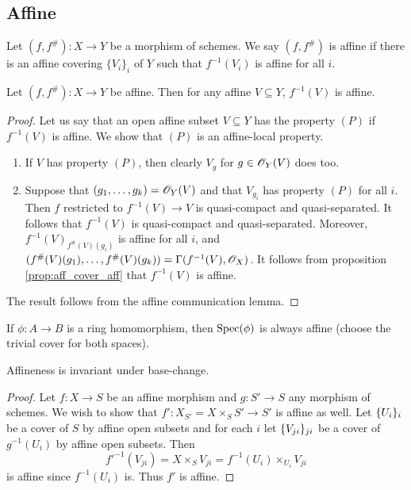\documentclass{memoir}
\begin{document}
\subsection{Affine}
\begin{definition}
    Let $(f,f^\#):X\to Y$ be a morphism of schemes.
    We say $(f,f^\#)$ is affine if there is an affine covering $\{V_i\}_i$ of $Y$ such that $f^{-1}(V_i)$ is affine for all $i$.
\end{definition}
\begin{thm}
    Let $(f,f^\#):X\to Y$ be affine.
    Then for any affine $V\subseteq Y$, $f^{-1}(V)$ is affine.
\end{thm}
\begin{proof}
    Let us say that an open affine subset $V\subseteq Y$ has the property $(P)$ if $f^{-1}(V)$ is affine.
    We show that $(P)$ is an affine-local property.
    \begin{enumerate}
        \item If $V$ has property $(P)$, then clearly $V_g$ for $g\in\mathscr{O}_Y(V)$ does too.
        \item Suppose that $(g_1,\dots,g_k) = \mathscr{O}_Y(V)$ and that $V_{g_i}$ has property $(P)$ for all $i$.
            Then $f$ restricted to $f^{-1}(V)\to V$ is quasi-compact and quasi-separated.
            It follows that $f^{-1}(V)$ is quasi-compact and quasi-separated.
            Moreover, $f^{-1}(V)_{f^\#(V)(g_i)}$ is affine for all $i$, and $(f^\#(V)(g_1),\dots,f^\#(V)(g_k)) = \Gamma(f^{-1}(V),\mathscr{O}_X)$.
            It follows from proposition \ref{prop:aff_cover_aff} that $f^{-1}(V)$ is affine.
    \end{enumerate}
    The result follows from the affine communication lemma.
\end{proof}
\begin{remark}
    If $\phi:A\to B$ is a ring homomorphism, then $\operatorname{Spec}(\phi)$ is always affine (choose the trivial cover for both spaces).
\end{remark}
\begin{proposition}
    Affineness is invariant under base-change.
\end{proposition}
\begin{proof}
    Let $f:X\to S$ be an affine morphism and $g:S'\to S$ any morphism of schemes.
    We wish to show that $f':X_{S'} = X\times_{S}S'\to S'$ is affine as well.
    Let $\lbrace U_i\rbrace_i$ be a cover of $S$ by affine open subsets and for each $i$ let $\lbrace V_{ji}\rbrace_{ji}$ be a cover of $g^{-1}(U_i)$ by affine open subsets.
    Then 
    \begin{equation}
        f'^{-1}(V_{ji}) = X\times_SV_{ji} = f^{-1}(U_i)\times_{U_i}V_{ji}
    \end{equation}
    is affine since $f^{-1}(U_i)$ is.
    Thus $f'$ is affine.
\end{proof}
\end{document}
